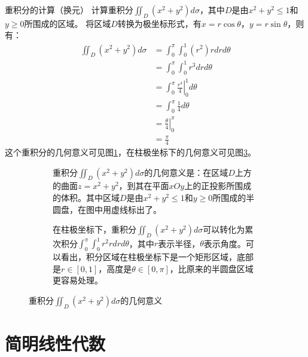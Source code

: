 \begin{example}{重积分的计算（换元）}{}
    计算重积分$\iint_D (x^2 + y^2) d\sigma$，其中$D$是由$x^2 + y^2 \le 1$和$y \ge 0$所围成的区域。
    \tcblower
    将区域$D$转换为极坐标形式，有$x = r \cos \theta$，$y = r \sin \theta$，则有：
    \begin{align}
        \iint_D (x^2 + y^2) d\sigma &= \int_0^{\pi} \int_0^1 (r^2) r dr d\theta \\
        &= \int_0^{\pi} \int_0^1 r^3 dr d\theta \\
        &= \int_0^{\pi} \left. \frac{r^4}{4} \right|_0^1 d\theta \\
        &= \int_0^{\pi} \frac{1}{4} d\theta \\
        &= \left. \frac{\theta}{4} \right|_0^{\pi} \\
        &= \frac{\pi}{4}
    \end{align}
    这个重积分的几何意义可见图\cref{fig:double_integral_example2}，在柱极坐标下的几何意义可见图\cref{fig:double_integral_polar}。
\end{example}

\begin{figure}
    \centering
    \begin{subfigure}{0.45\textwidth}
        \centering
        
        \caption{重积分$\iint_D (x^2 + y^2) d\sigma$的几何意义是：在区域$D$上方的曲面$z = x^2 + y^2$，到其在平面$xOy$上的正投影所围成的体积。其中区域$D$是由$x^2 + y^2 \le 1$和$y \ge 0$所围成的半圆盘，在图中用虚线标出了。}
        \label{fig:double_integral_example2}
    \end{subfigure}
    \begin{subfigure}{0.45\textwidth}
        \centering
        
        \caption{在柱极坐标下，重积分$\iint_D (x^2 + y^2) d\sigma$可以转化为累次积分$\int_0^{\pi} \int_0^1 r^2 r dr d\theta$，其中$r$表示半径，$\theta$表示角度。可以看出，积分区域在柱极坐标下是一个矩形区域，底部是$r \in [0, 1]$，高度是$\theta \in [0, \pi]$，比原来的半圆盘区域更容易处理。}
        \label{fig:double_integral_polar}
    \end{subfigure}
    \caption{重积分$\iint_D (x^2 + y^2) d\sigma$的几何意义}
\end{figure}

\section{简明线性代数}

